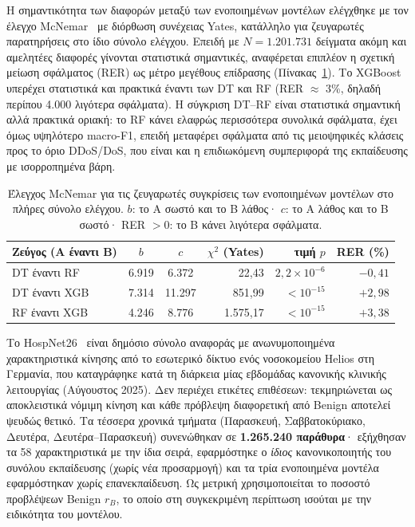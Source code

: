
Η σημαντικότητα των διαφορών μεταξύ των ενοποιημένων μοντέλων ελέγχθηκε με τον έλεγχο McNemar~\cite{mcnemar1947note} με διόρθωση συνέχειας Yates, κατάλληλο για ζευγαρωτές παρατηρήσεις στο ίδιο σύνολο ελέγχου. Επειδή με $N = 1.201.731$ δείγματα ακόμη και αμελητέες διαφορές γίνονται στατιστικά σημαντικές, αναφέρεται επιπλέον η σχετική μείωση σφάλματος (RER) ως μέτρο μεγέθους επίδρασης (Πίνακας~\ref{gr:tab:mcnemar}). Το XGBoost υπερέχει στατιστικά και πρακτικά έναντι των DT και RF (RER $\approx$ 3\%, δηλαδή περίπου 4.000 λιγότερα σφάλματα). Η σύγκριση DT--RF είναι στατιστικά σημαντική αλλά πρακτικά οριακή: το RF κάνει ελαφρώς περισσότερα συνολικά σφάλματα, έχει όμως υψηλότερο macro-F1, επειδή μεταφέρει σφάλματα από τις μειοψηφικές κλάσεις προς το όριο DDoS/DoS, που είναι και η επιδιωκόμενη συμπεριφορά της εκπαίδευσης με ισορροπημένα βάρη.

\begin{table}[!htbp]
\centering
\caption[]{Έλεγχος McNemar για τις ζευγαρωτές συγκρίσεις των ενοποιημένων μοντέλων στο πλήρες σύνολο ελέγχου. $b$: το Α σωστό και το Β λάθος· $c$: το Α λάθος και το Β σωστό· RER $> 0$: το Β κάνει λιγότερα σφάλματα.}
\label{gr:tab:mcnemar}
\small
\begin{tabular}{@{}l c c r r r@{}}
\toprule
\textbf{Ζεύγος (Α έναντι Β)} & $b$ & $c$ & $\chi^2$ (Yates) & \textbf{τιμή $p$} & \textbf{RER (\%)} \\
\midrule
DT έναντι RF  & 6.919 & 6.372  & 22,43    & $2{,}2 \times 10^{-6}$ & $-0{,}41$ \\
DT έναντι XGB & 7.314 & 11.297 & 851,99   & $< 10^{-15}$ & $+2{,}98$ \\
RF έναντι XGB & 4.246 & 8.776  & 1.575,17 & $< 10^{-15}$ & $+3{,}38$ \\
\bottomrule
\end{tabular}
\end{table}



Το HospNet26~\cite{hospnet26} είναι δημόσιο σύνολο αναφοράς με ανωνυμοποιημένα χαρακτηριστικά κίνησης από το εσωτερικό δίκτυο ενός νοσοκομείου Helios στη Γερμανία, που καταγράφηκε κατά τη διάρκεια μίας εβδομάδας κανονικής κλινικής λειτουργίας (Αύγουστος 2025). Δεν περιέχει ετικέτες επιθέσεων: τεκμηριώνεται ως αποκλειστικά νόμιμη κίνηση και κάθε πρόβλεψη διαφορετική από Benign αποτελεί ψευδώς θετικό. Τα τέσσερα χρονικά τμήματα (Παρασκευή, Σαββατοκύριακο, Δευτέρα, Δευτέρα--Παρασκευή) συνενώθηκαν σε \textbf{1.265.240 παράθυρα}· εξήχθησαν τα 58 χαρακτηριστικά με την ίδια σειρά, εφαρμόστηκε ο \textit{ίδιος} κανονικοποιητής του συνόλου εκπαίδευσης (χωρίς νέα προσαρμογή) και τα τρία ενοποιημένα μοντέλα εφαρμόστηκαν χωρίς επανεκπαίδευση. Ως μετρική χρησιμοποιείται το ποσοστό προβλέψεων Benign $r_B$, το οποίο στη συγκεκριμένη περίπτωση ισούται με την ειδικότητα του μοντέλου.

